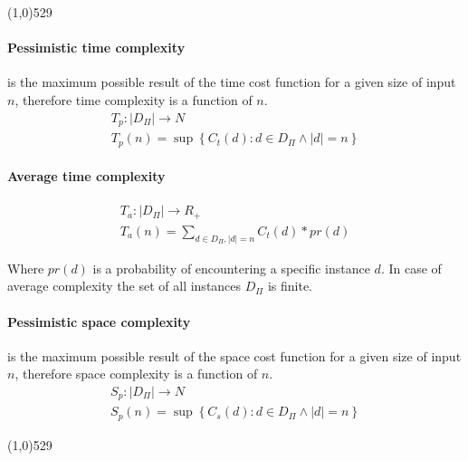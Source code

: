 \documentclass{article}
\newcommand{\separator}{\noindent \line(1,0){529}}
\begin{document}
\separator

\begin{multicols}{2}

\paragraph{Pessimistic time complexity}
is the maximum possible result of the time cost function for a given size of input $n$, 
therefore time complexity is a function of $n$.
\begin{gather*}
T_p : | D_\Pi | \rightarrow N \\
T_p(n) = \sup \left\{ C_t(d) : d \in D_\Pi \wedge |d| = n \right\}
\end{gather*}

\paragraph{Average time complexity}
\begin{gather*}
T_a : | D_\Pi | \rightarrow R_+ \\
T_a(n) = \sum_{d \in D_\Pi, |d|=n} C_t(d) * pr(d)
\end{gather*}

Where $pr(d)$ is a probability of encountering a specific instance $d$. In case of average
complexity the set of all instances $D_\Pi$ is finite.

\paragraph{Pessimistic space complexity}
is the maximum possible result of the space cost function for a given size of input $n$, 
therefore space complexity is a function of $n$.
\begin{gather*}
S_p : | D_\Pi | \rightarrow N \\
S_p(n) = \sup \left\{  C_s(d) : d \in D_\Pi \wedge |d| = n \right\}
\end{gather*}

\end{multicols}

\separator

\end{document}
